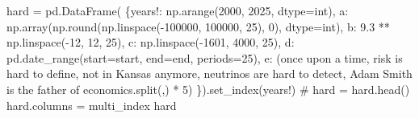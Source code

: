\documentclass[
  12pt,
  a4paper,
  DIV=11,
  numbers=noendperiod]{scrartcl}
\newenvironment{Shaded}{\begin{snugshade}}{\end{snugshade}}
\newcommand{\BuiltInTok}[1]{\textcolor[rgb]{0.00,0.23,0.31}{#1}}
\newcommand{\CommentTok}[1]{\textcolor[rgb]{0.37,0.37,0.37}{#1}}
\newcommand{\DecValTok}[1]{\textcolor[rgb]{0.68,0.00,0.00}{#1}}
\newcommand{\FloatTok}[1]{\textcolor[rgb]{0.68,0.00,0.00}{#1}}
\newcommand{\NormalTok}[1]{\textcolor[rgb]{0.00,0.23,0.31}{#1}}
\newcommand{\OperatorTok}[1]{\textcolor[rgb]{0.37,0.37,0.37}{#1}}
\newcommand{\StringTok}[1]{\textcolor[rgb]{0.13,0.47,0.30}{#1}}
\begin{document}
\begin{Shaded}
\begin{Highlighting}[]
\NormalTok{hard }\OperatorTok{=}\NormalTok{ pd.DataFrame(}
\NormalTok{\{}\StringTok{\textquotesingle{}years!\textquotesingle{}}\NormalTok{: np.arange(}\DecValTok{2000}\NormalTok{, }\DecValTok{2025}\NormalTok{, dtype}\OperatorTok{=}\BuiltInTok{int}\NormalTok{),}
\StringTok{\textquotesingle{}a\textquotesingle{}}\NormalTok{: np.array(np.}\BuiltInTok{round}\NormalTok{(np.linspace(}\OperatorTok{{-}}\DecValTok{100000}\NormalTok{, }\DecValTok{100000}\NormalTok{, }\DecValTok{25}\NormalTok{), }\DecValTok{0}\NormalTok{), dtype}\OperatorTok{=}\BuiltInTok{int}\NormalTok{),}
\StringTok{\textquotesingle{}b\textquotesingle{}}\NormalTok{: }\FloatTok{9.3} \OperatorTok{**}\NormalTok{ np.linspace(}\OperatorTok{{-}}\DecValTok{12}\NormalTok{, }\DecValTok{12}\NormalTok{, }\DecValTok{25}\NormalTok{),}
\StringTok{\textquotesingle{}c\textquotesingle{}}\NormalTok{: np.linspace(}\OperatorTok{{-}}\DecValTok{1601}\NormalTok{, }\DecValTok{4000}\NormalTok{, }\DecValTok{25}\NormalTok{),}
\StringTok{\textquotesingle{}d\textquotesingle{}}\NormalTok{: pd.date\_range(start}\OperatorTok{=}\NormalTok{start, end}\OperatorTok{=}\NormalTok{end, periods}\OperatorTok{=}\DecValTok{25}\NormalTok{),}
\StringTok{\textquotesingle{}e\textquotesingle{}}\NormalTok{: (}\StringTok{\textquotesingle{}once upon a time, risk is hard to define, not in Kansas anymore, \textquotesingle{}}
        \StringTok{\textquotesingle{}neutrinos are hard to detect,  \textquotesingle{}}
        \StringTok{\textquotesingle{}Adam Smith is the father of economics\textquotesingle{}}\NormalTok{.split(}\StringTok{\textquotesingle{},\textquotesingle{}}\NormalTok{) }\OperatorTok{*} \DecValTok{5}\NormalTok{)}
\NormalTok{\}).set\_index(}\StringTok{\textquotesingle{}years!\textquotesingle{}}\NormalTok{)}
\CommentTok{\# hard = hard.head()}
\NormalTok{hard.columns }\OperatorTok{=}\NormalTok{ multi\_index}
\NormalTok{hard}
\end{Highlighting}
\end{Shaded}
\end{document}
